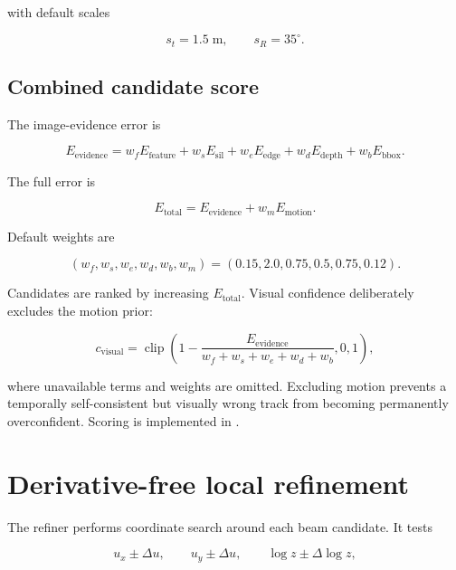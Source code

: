 \documentclass[11pt]{article}
\newcommand{\clip}{\operatorname{clip}}
\begin{document}
with default scales

\begin{equation}
s_t=1.5\;\mathrm{m},
\qquad
s_R=35^\circ.
\end{equation}

\subsection{Combined candidate score}

The image-evidence error is

\begin{equation}
E_{\mathrm{evidence}}=
w_fE_{\mathrm{feature}}
+w_sE_{\mathrm{sil}}
+w_eE_{\mathrm{edge}}
+w_dE_{\mathrm{depth}}
+w_bE_{\mathrm{bbox}}.
\end{equation}

The full error is

\begin{equation}
E_{\mathrm{total}}=E_{\mathrm{evidence}}+w_mE_{\mathrm{motion}}.
\end{equation}

Default weights are

\begin{equation}
(w_f,w_s,w_e,w_d,w_b,w_m)
=(0.15,2.0,0.75,0.5,0.75,0.12).
\end{equation}

Candidates are ranked by increasing $E_{\mathrm{total}}$. Visual confidence
deliberately excludes the motion prior:

\begin{equation}
c_{\mathrm{visual}}=\clip\left(
1-\frac{E_{\mathrm{evidence}}}
{w_f+w_s+w_e+w_d+w_b},
0,1
\right),
\end{equation}

where unavailable terms and weights are omitted. Excluding motion prevents a
temporally self-consistent but visually wrong track from becoming permanently
overconfident. Scoring is implemented in .

\section{Derivative-free local refinement}

The refiner performs coordinate search around each beam candidate. It tests

\begin{equation}
u_x\pm\Delta u,
\qquad
u_y\pm\Delta u,
\qquad
\log z\pm\Delta\log z,
\end{equation}
\end{document}
